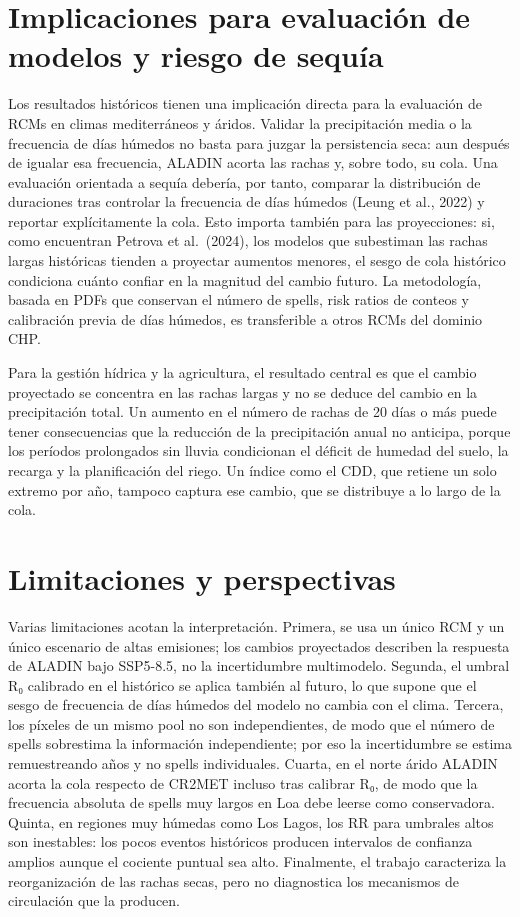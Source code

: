 \section{Implicaciones para evaluación de modelos y riesgo de sequía}\label{sec:implicaciones}

Los resultados históricos tienen una implicación directa para la evaluación de RCMs en climas mediterráneos y áridos. Validar la precipitación media o la frecuencia de días húmedos no basta para juzgar la persistencia seca: aun después de igualar esa frecuencia, ALADIN acorta las rachas y, sobre todo, su cola. Una evaluación orientada a sequía debería, por tanto, comparar la distribución de duraciones tras controlar la frecuencia de días húmedos (Leung et al., 2022) y reportar explícitamente la cola. Esto importa también para las proyecciones: si, como encuentran Petrova et al.~(2024), los modelos que subestiman las rachas largas históricas tienden a proyectar aumentos menores, el sesgo de cola histórico condiciona cuánto confiar en la magnitud del cambio futuro. La metodología, basada en PDFs que conservan el número de spells, risk ratios de conteos y calibración previa de días húmedos, es transferible a otros RCMs del dominio CHP.

Para la gestión hídrica y la agricultura, el resultado central es que el cambio proyectado se concentra en las rachas largas y no se deduce del cambio en la precipitación total. Un aumento en el número de rachas de 20 días o más puede tener consecuencias que la reducción de la precipitación anual no anticipa, porque los períodos prolongados sin lluvia condicionan el déficit de humedad del suelo, la recarga y la planificación del riego. Un índice como el CDD, que retiene un solo extremo por año, tampoco captura ese cambio, que se distribuye a lo largo de la cola.

\section{Limitaciones y perspectivas}\label{sec:limitaciones}

Varias limitaciones acotan la interpretación. Primera, se usa un único RCM y un único escenario de altas emisiones; los cambios proyectados describen la respuesta de ALADIN bajo SSP5-8.5, no la incertidumbre multimodelo. Segunda, el umbral R₀ calibrado en el histórico se aplica también al futuro, lo que supone que el sesgo de frecuencia de días húmedos del modelo no cambia con el clima. Tercera, los píxeles de un mismo pool no son independientes, de modo que el número de spells sobrestima la información independiente; por eso la incertidumbre se estima remuestreando años y no spells individuales. Cuarta, en el norte árido ALADIN acorta la cola respecto de CR2MET incluso tras calibrar R₀, de modo que la frecuencia absoluta de spells muy largos en Loa debe leerse como conservadora. Quinta, en regiones muy húmedas como Los Lagos, los RR para umbrales altos son inestables: los pocos eventos históricos producen intervalos de confianza amplios aunque el cociente puntual sea alto. Finalmente, el trabajo caracteriza la reorganización de las rachas secas, pero no diagnostica los mecanismos de circulación que la producen.

